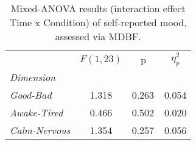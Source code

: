 \begin{table}[h]
\centering
\caption{Mixed-ANOVA results (interaction effect Time x Condition) of self-reported mood, assessed via MDBF.}
\label{tab:tab_questionnaire_mdbf_interaction}

\begin{tabular}{l||SSS}
\toprule
{} & {$F(1, 23)$} &         {p} & {$\eta^2_p$} \\
\textit{Dimension}    &              &             &              \\
\midrule
\textit{Good-Bad}     &        1.318 &  0.263$^{}$ &        0.054 \\
\textit{Awake-Tired}  &        0.466 &  0.502$^{}$ &        0.020 \\
\textit{Calm-Nervous} &        1.354 &  0.257$^{}$ &        0.056 \\
\bottomrule
\end{tabular}
\end{table}
